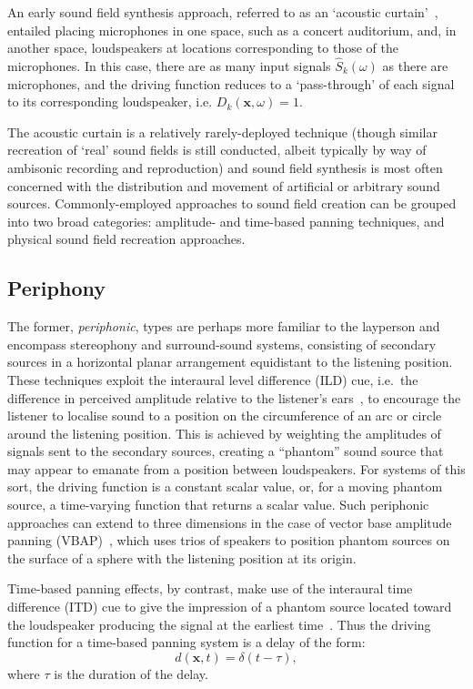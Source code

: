 An early sound field synthesis approach, referred to as an `acoustic
curtain'~\citep{ziemer_wave_2020}, entailed placing microphones in one space,
such as a concert auditorium, and, in another space, loudspeakers at locations
corresponding to those of the microphones.
In this case, there are as many input signals $\hat{S}_k(\omega)$ as there are
microphones, and the driving function reduces to a `pass-through' of each
signal to its corresponding loudspeaker, i.e. $D_k(\mathbf{x}, \omega) = 1$.

The acoustic curtain is a relatively rarely-deployed technique (though similar
recreation of `real' sound fields is still conducted, albeit typically by way
of ambisonic recording and reproduction) and sound field synthesis is most
often concerned with the distribution and movement of artificial or arbitrary
sound sources.
Commonly-employed approaches to sound field creation can be grouped into two
broad categories: amplitude- and time-based panning techniques, and physical
sound field recreation approaches.

\subsection{Periphony}\label{subsec:periphony}

The former, \textit{periphonic}, types are perhaps more familiar to the
layperson and encompass stereophony and surround-sound systems, consisting of
secondary sources in a horizontal planar arrangement equidistant to the
listening position.
These techniques exploit the interaural level difference (ILD) cue, i.e.\ the
difference in perceived amplitude relative to the listener's
ears~\citep{pulkki_virtual_1997,verheijen_sound_1998,ziemer_wave_2020}, to
encourage the listener to localise sound to a position on the circumference of
an arc or circle around the listening position.
This is achieved by weighting the amplitudes of signals sent to the
secondary sources, creating a ``phantom'' sound source that may appear to
emanate from a position between loudspeakers.
For systems of this sort, the driving function is a constant scalar value, or,
for a moving phantom source, a time-varying function that returns a scalar
value.
Such periphonic approaches can extend to three dimensions in the case of
vector base amplitude panning (VBAP)~\citep{pulkki_virtual_1997}, which uses
trios of speakers to position phantom sources on the surface of a sphere
with the listening position at its origin.

Time-based panning effects, by contrast, make use of the interaural time
difference (ITD) cue to give the impression of a phantom source located toward
the loudspeaker producing the signal at the earliest
time~\citep{pulkki_virtual_1997,verheijen_sound_1998}.
Thus the driving function for a time-based panning system is a delay of the
form:
\begin{equation}
    d(\mathbf{x},t) = \delta(t - \tau),
    \label{eq:time-driving-function}
\end{equation}
where $\tau$ is the duration of the delay.

